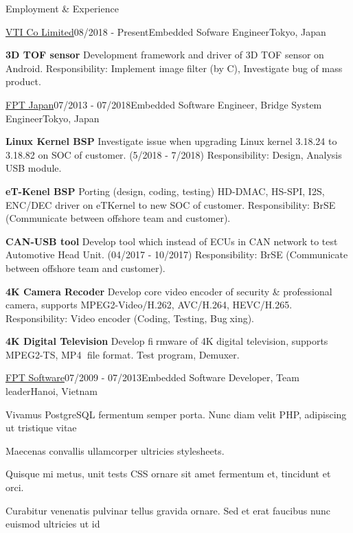 \documentclass{resume}
\begin{document}
  \begin{rSection}{Employment \& Experience}
  
    \begin{rSubsection}{\underline{VTI Co Limited}}{08/2018 - Present}{Embedded Sofware Engineer}{Tokyo, Japan}
    \item \textbf{3D TOF sensor} Development framework and driver of 3D TOF sensor on Android. 
    \newline Responsibility: Implement image filter (by C), Investigate bug of mass product.
    \end{rSubsection}
  
    \begin{rSubsection}{\underline{FPT Japan}}{07/2013 - 07/2018}{Embedded Software Engineer, Bridge System Engineer}{Tokyo, Japan}
    \item \textbf{Linux Kernel BSP} Investigate issue when upgrading Linux kernel 3.18.24 to 3.18.82 on SOC of customer. (5/2018 - 7/2018)
    \newline Responsibility: Design, Analysis USB module.

    \item \textbf{eT-Kenel BSP} Porting (design, coding, testing) HD-DMAC, HS-SPI, I2S, ENC/DEC driver on eTKernel to new SOC of customer.
    \newline Responsibility: BrSE (Communicate between offshore team and customer).

    \item \textbf{CAN-USB tool} Develop tool which instead of ECUs in CAN network to test Automotive Head Unit. (04/2017 - 10/2017) 
    \newline Responsibility: BrSE (Communicate between offshore team and customer).

    \item \textbf{4K Camera Recoder} Develop core video encoder of security \& professional camera, supports MPEG2-Video/H.262, AVC/H.264, HEVC/H.265.
    \newline Responsibility: Video encoder (Coding, Testing, Bugxing).

    \item \textbf{4K Digital Television} Develop firmware of 4K digital television, supports MPEG2-TS, MP4 file format.
    \newline Test program, Demuxer.

    \end{rSubsection}

    \begin{rSubsection}{\underline{FPT Software}}{07/2009 - 07/2013}{Embedded Software Developer, Team leader}{Hanoi, Vietnam}
    \item Vivamus PostgreSQL fermentum semper porta. Nunc diam velit PHP, adipiscing ut tristique vitae
    \item Maecenas convallis ullamcorper ultricies stylesheets.
    \item Quisque mi metus, unit tests CSS ornare sit amet fermentum et, tincidunt et orci.
    \item Curabitur venenatis pulvinar tellus gravida ornare. Sed et erat faucibus nunc euismod ultricies ut id
    \end{rSubsection}
  
  \end{rSection}
  
\end{document}
